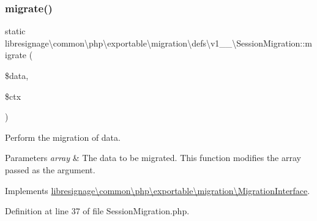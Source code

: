 \subsubsection{\texorpdfstring{migrate()}{migrate()}}
{\footnotesize\ttfamily static libresignage\textbackslash{}common\textbackslash{}php\textbackslash{}exportable\textbackslash{}migration\textbackslash{}defs\textbackslash{}v1\+\_\+\_\textbackslash{}\+Session\+Migration\+::migrate (\begin{DoxyParamCaption}\item[{array \&}]{\$data,  }\item[{\hyperlink{classlibresignage_1_1common_1_1php_1_1exportable_1_1ExportableDataContext}{Exportable\+Data\+Context}}]{\$ctx }\end{DoxyParamCaption})\hspace{0.3cm}{\ttfamily [static]}}

Perform the migration of data.


\begin{DoxyParams}{Parameters}
{\em array} & The data to be migrated. This function modifies the array passed as the argument. \\
\hline
\end{DoxyParams}


Implements \hyperlink{interfacelibresignage_1_1common_1_1php_1_1exportable_1_1migration_1_1MigrationInterface_a8275bfe14f59f19bb3b33b239fd48c5d}{libresignage\textbackslash{}common\textbackslash{}php\textbackslash{}exportable\textbackslash{}migration\textbackslash{}\+Migration\+Interface}.



Definition at line 37 of file Session\+Migration.\+php.

\mbox{\label{classlibresignage_1_1common_1_1php_1_1exportable_1_1migration_1_1defs_1_1v1__0__0_1_1SessionMigration_adda11b969684868d4cfd93186f52f805}} 
